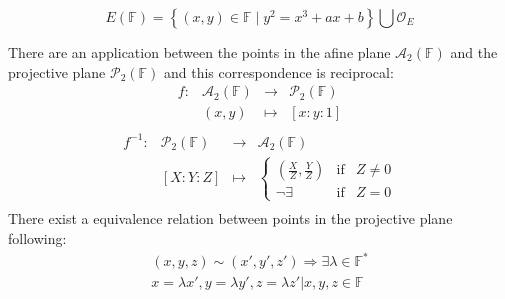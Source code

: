 \documentclass[10pt,a4paper,twoside]{llncs}
\newcommand{\PaIe}{\ensuremath{\mathcal{O}_{E}}}%
\begin{document}
\begin{equation}\label{eq:ECsetP}
 E\left(\mathbb{F}\right) = \left\{ \left(x,y\right) \in \mathbb{F} \mid y^2=x^3+ax+b \right\} \bigcup \PaIe
\end{equation}


\begin{definition}\label{def:afinproy}
 There are an application between the points in the afine plane $\mathcal{A}_{2}\left(\mathbb{F}\right)$ and the projective plane $\mathcal{P}_{2}\left(\mathbb{F}\right)$ and this correspondence is reciprocal:
\begin{equation}
        \begin{array}{cccc}
        f: & \mathcal{A}_{2}\left(\mathbb{F}\right) & \rightarrow & \mathcal{P}_{2}\left(\mathbb{F}\right) \\
        \; & (x,y)                                 & \mapsto     & [x:y:1] \\
        \end{array}
\end{equation}
\begin{equation}
        \begin{array}{cccc}
        f^{-1}: & \mathcal{P}_{2}\left(\mathbb{F}\right) & \rightarrow & \mathcal{A}_{2}\left(\mathbb{F}\right) \\
        \;      & \left[X:Y:Z\right]                    & \mapsto     & \left\{ \begin{array}{ccc}
                                                                                \left(\frac{X}{Z},\frac{Y}{Z}\right) & \text{if} & Z\neq0\\
                                                                                \neg\exists & \text{if} & Z=0
                                                                                \end{array}
                                                                        \right. \\
        \end{array}
\end{equation}
There exist a equivalence relation between points in the projective plane following:
\begin{equation}
        \begin{array}{c}
                \left(x,y,z\right) \sim \left(x',y',z'\right) \Rightarrow \exists\lambda \in \mathbb{F}^{*} \\
                 x=\lambda x', y=\lambda y',z=\lambda z' | x,y,z \in \mathbb{F}
        \end{array}
\end{equation}
\end{definition}
\end{document}
